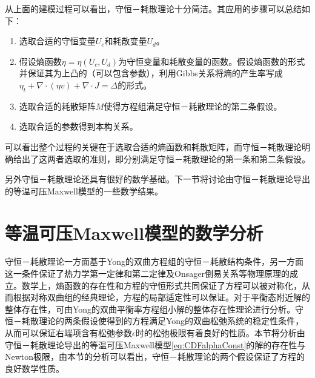 从上面的建模过程可以看出，守恒－耗散理论十分简洁。其应用的步骤可以总结如下：
\begin{enumerate}
	\item 选取合适的守恒变量$U_c$和耗散变量$U_d$。
	\item 假设熵函数$\eta = \eta(U_c,U_d)$为守恒变量和耗散变量的函数。假设熵函数的形式并保证其为上凸的（可以包含参数），利用Gibbs关系将熵的产生率写成$\eta_t+ \nabla \cdot (\eta v) + \nabla \cdot J = \Delta$的形式。
	\item 选取合适的耗散矩阵$M$使得方程组满足守恒－耗散理论的第二条假设。
	\item 选取合适的参数得到本构关系。
\end{enumerate}
可以看出整个过程的关键在于选取合适的熵函数和耗散矩阵，而守恒－耗散理论明确给出了这两者选取的准则，即分别满足守恒－耗散理论的第一条和第二条假设。


另外守恒－耗散理论还具有很好的数学基础。下一节将讨论由守恒－耗散理论导出的等温可压Maxwell模型的一些数学结果。

	\section{等温可压Maxwell模型的数学分析}
	守恒－耗散理论一方面基于Yong的双曲方程组的守恒－耗散结构条件，另一方面这一条件保证了热力学第一定律和第二定律及Onsager倒易关系等物理原理的成立。数学上，熵函数的存在性和方程的守恒形式共同保证了方程可以被对称化，从而根据对称双曲组的经典理论，方程的局部适定性可以保证\cite{kato1975cauchy,majda2012compressible}。对于平衡态附近解的整体存在性，可由Yong的双曲平衡率方程组小解的整体存在性理论进行分析\cite{yong2004entropy,kawashima2009decay}。守恒－耗散理论的两条假设使得到的方程满足Yong的双曲松弛系统的稳定性条件\cite{yong1999singular}，从而可以保证右端项含有松弛参数$\epsilon$时的松弛极限有着良好的性质。本节将分析由守恒－耗散理论导出的等温可压Maxwell模型\eqref{eq:CDFalphaConst}的解的存在性与Newton极限，由本节的分析可以看出，守恒－耗散理论的两个假设保证了方程的良好数学性质。

